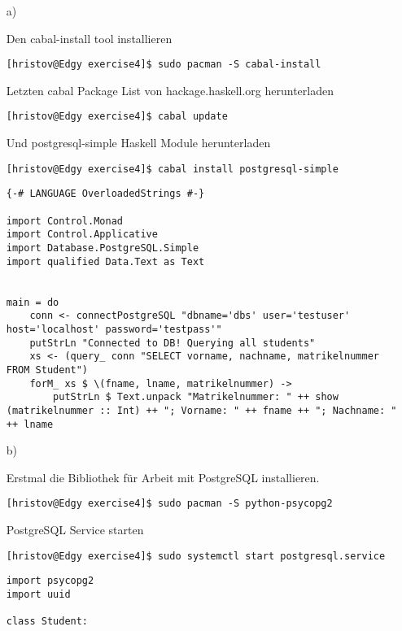 \begin{itemize}

\item[a)]

Den cabal-install tool installieren
\begin{lstlisting}[style=Bash]
	[hristov@Edgy exercise4]$ sudo pacman -S cabal-install
\end{lstlisting}
Letzten cabal Package List von hackage.haskell.org herunterladen
\begin{lstlisting}[style=Bash]
	[hristov@Edgy exercise4]$ cabal update
\end{lstlisting}
Und postgresql-simple Haskell Module herunterladen
\begin{lstlisting}[style=Bash]
	[hristov@Edgy exercise4]$ cabal install postgresql-simple
\end{lstlisting}

\begin{lstlisting}[style=hs]
{-# LANGUAGE OverloadedStrings #-}

import Control.Monad
import Control.Applicative
import Database.PostgreSQL.Simple
import qualified Data.Text as Text


main = do
	conn <- connectPostgreSQL "dbname='dbs' user='testuser' host='localhost' password='testpass'"
	putStrLn "Connected to DB! Querying all students"
	xs <- (query_ conn "SELECT vorname, nachname, matrikelnummer FROM Student")
	forM_ xs $ \(fname, lname, matrikelnummer) ->
  		putStrLn $ Text.unpack "Matrikelnummer: " ++ show (matrikelnummer :: Int) ++ "; Vorname: " ++ fname ++ "; Nachname: " ++ lname
\end{lstlisting}


\item[b)]

Erstmal die Bibliothek für Arbeit mit PostgreSQL installieren.

\begin{lstlisting}[style=Bash]
	[hristov@Edgy exercise4]$ sudo pacman -S python-psycopg2
\end{lstlisting}

PostgreSQL Service starten

\begin{lstlisting}[style=Bash]
	[hristov@Edgy exercise4]$ sudo systemctl start postgresql.service
\end{lstlisting}

\begin{lstlisting}[style=py]
	import psycopg2
import uuid

class Student:
	

\end{lstlisting}
\end{itemize}
